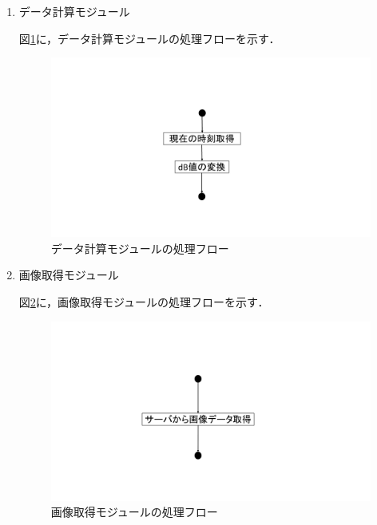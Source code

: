 \begin{enumerate}
\item データ計算モジュール

図\ref{fig;1-3}に，データ計算モジュールの処理フローを示す．

\begin{figure}[H]
	\begin{center}
	\includegraphics[width=15cm, bb=0 0 1000 540, clip]{./app_pic/app1-3.pdf}
	\caption{データ計算モジュールの処理フロー}
	\label{fig;1-3}
	\end{center}
\end{figure}

\item 画像取得モジュール

図\ref{fig;1-4}に，画像取得モジュールの処理フローを示す．

\begin{figure}[H]
	\begin{center}
	\includegraphics[width=15cm, bb=0 0 1000 540, clip]{./app_pic/app1-4.pdf}
	\caption{画像取得モジュールの処理フロー}
	\label{fig;1-4}
	\end{center}
\end{figure}


\end{enumerate}
